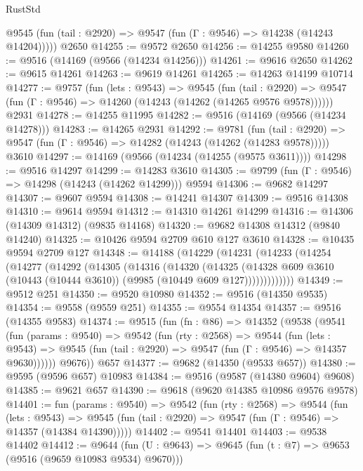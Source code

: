 \begin{lexlean}{RustStd}
\begin{coremodule}
      @9545 (fun (tail : @2920) => @9547 (fun (Γ : @9546) => @14238 (@14243 @14204)))))
    @2650
@14255 := @9572 @2650
@14256 := @14255 @9580
@14260 := @9516 (@14169 (@9566 (@14234 @14256)))
@14261 := @9616 @2650
@14262 := @9615 @14261
@14263 := @9619 @14261
@14265 := @14263 @14199 @10714
@14277 := @9757
    (fun (lets : @9543) =>
    @9545
      (fun (tail : @2920) =>
      @9547 (fun (Γ : @9546) => @14260 (@14243 (@14262 (@14265 @9576 @9578))))))
    @2931
@14278 := @14255 @11995
@14282 := @9516 (@14169 (@9566 (@14234 @14278)))
@14283 := @14265 @2931
@14292 := @9781
    (fun (tail : @2920) => @9547 (fun (Γ : @9546) => @14282 (@14243 (@14262 (@14283 @9578)))))
    @3610
@14297 := @14169 (@9566 (@14234 (@14255 (@9575 @3611))))
@14298 := @9516 @14297
@14299 := @14283 @3610
@14305 := @9799 (fun (Γ : @9546) => @14298 (@14243 (@14262 @14299))) @9594
@14306 := @9682 @14297
@14307 := @9607 @9594
@14308 := @14241 @14307
@14309 := @9516 @14308
@14310 := @9614 @9594
@14312 := @14310 @14261 @14299
@14316 := @14306 (@14309 @14312) (@9835 @14168)
@14320 := @9682 @14308 @14312 (@9840 @14240)
@14325 := @10426 @9594 @2709 @610 @127 @3610
@14328 := @10435 @9594 @2709 @127
@14348 := @14188
    (@14229
      (@14231
        (@14233
          (@14254
            (@14277
              (@14292
                (@14305
                  (@14316
                    (@14320
                      (@14325
                        (@14328
                          @609
                          @3610
                          (@10443 (@10444 @3610))
                          (@9985 (@10449 @609 @127)))))))))))))
@14349 := @9512 @251
@14350 := @9520 @10980
@14352 := @9516 (@14350 @9535)
@14354 := @9558 (@9559 @251)
@14355 := @9554 @14354
@14357 := @9516 (@14355 @9583)
@14374 := @9515
    (fun (fn : @86) =>
    @14352
      (@9538
        (@9541
          (fun (params : @9540) =>
          @9542
            (fun (rty : @2568) =>
            @9544
              (fun (lets : @9543) =>
              @9545 (fun (tail : @2920) => @9547 (fun (Γ : @9546) => @14357 @9630))))))
        @9676))
    @657
@14377 := @9682 (@14350 (@9533 @657))
@14380 := @9595 (@9596 @657) @10983
@14384 := @9516 (@9587 (@14380 @9604) @9608)
@14385 := @9621 @657
@14390 := @9618 (@9620 @14385 @10986 @9576 @9578)
@14401 := fun (params : @9540) =>
  @9542
    (fun (rty : @2568) =>
    @9544
      (fun (lets : @9543) =>
      @9545 (fun (tail : @2920) => @9547 (fun (Γ : @9546) => @14357 (@14384 @14390)))))
@14402 := @9541 @14401
@14403 := @9538 @14402
@14412 := @9644
    (fun (U : @9643) => @9645 (fun (t : @7) => @9653 (@9516 (@9659 @10983 @9534) @9670)))

\end{coremodule}
\end{lexlean}
